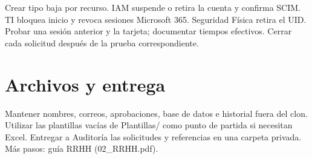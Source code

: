 \documentclass[12pt,a4paper]{article}
\begin{document}
Crear tipo baja por recurso. IAM suspende o retira la cuenta y confirma SCIM. TI bloquea inicio y revoca sesiones Microsoft 365. Seguridad Física retira el UID. Probar una sesión anterior y la tarjeta; documentar tiempos efectivos. Cerrar cada solicitud después de la prueba correspondiente.\par
{}\section*{Archivos y entrega}
Mantener nombres, correos, aprobaciones, base de datos e historial fuera del clon. Utilizar las plantillas vacías de \textnormal{Plantillas/\allowbreak{}} como punto de partida si necesitan Excel. Entregar a Auditoría las solicitudes y referencias en una carpeta privada. Más pasos: guía RRHH (02\_RRHH.pdf).\par
\end{document}
